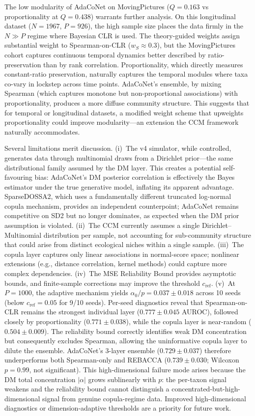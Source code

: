 \documentclass[unnumsec,webpdf,contemporary,large,numbered]{oup-authoring-template}
\theoremstyle{plain}
\theoremstyle{definition}
\begin{document}
The low modularity of AdaCoNet on MovingPictures ($Q{=}0.163$ vs proportionality at $Q{=}0.438$) warrants further analysis. On this longitudinal dataset ($N{=}1967$, $P{=}926$), the high sample size places the data firmly in the $N \gg P$ regime where Bayesian CLR is used. The theory-guided weights assign substantial weight to Spearman-on-CLR ($w_S \approx 0.3$), but the MovingPictures cohort captures continuous temporal dynamics better described by ratio-preservation than by rank correlation. Proportionality, which directly measures constant-ratio preservation, naturally captures the temporal modules where taxa co-vary in lockstep across time points. AdaCoNet's ensemble, by mixing Spearman (which captures monotone but non-proportional associations) with proportionality, produces a more diffuse community structure. This suggests that for temporal or longitudinal datasets, a modified weight scheme that upweights proportionality could improve modularity---an extension the CCM framework naturally accommodates.

Several limitations merit discussion. (i)~The v4 simulator, while controlled, generates data through multinomial draws from a Dirichlet prior---the same distributional family assumed by the DM layer. This creates a potential self-favouring bias: AdaCoNet's DM posterior correlation is effectively the Bayes estimator under the true generative model, inflating its apparent advantage. SparseDOSSA2, which uses a fundamentally different truncated log-normal copula mechanism, provides an independent counterpoint; AdaCoNet remains competitive on SD2 but no longer dominates, as expected when the DM prior assumption is violated. (ii)~The CCM currently assumes a single Dirichlet--Multinomial distribution per sample, not accounting for sub-community structure that could arise from distinct ecological niches within a single sample. (iii)~The copula layer captures only linear associations in normal-score space; nonlinear extensions (e.g., distance correlation, kernel methods) could capture more complex dependencies. (iv)~The MSE Reliability Bound provides asymptotic bounds, and finite-sample corrections may improve the threshold $c_{\text{ref}}$. (v)~At $P{=}1000$, the adaptive mechanism yields $\alpha_0/p = 0.037 \pm 0.018$ across 10 seeds (below $c_{\text{ref}} = 0.05$ for 9/10 seeds). Per-seed diagnostics reveal that Spearman-on-CLR remains the strongest individual layer ($0.777 \pm 0.045$ AUROC), followed closely by proportionality ($0.771 \pm 0.038$), while the copula layer is near-random ($0.504 \pm 0.009$). The reliability bound correctly identifies weak DM concentration but consequently excludes Spearman, allowing the uninformative copula layer to dilute the ensemble. AdaCoNet's 3-layer ensemble ($0.729 \pm 0.037$) therefore underperforms both Spearman-only and REBACCA ($0.739 \pm 0.030$; Wilcoxon $p = 0.99$, not significant). This high-dimensional failure mode arises because the DM total concentration $|\alpha|$ grows sublinearly with $p$: the per-taxon signal weakens and the reliability bound cannot distinguish a concentrated-but-high-dimensional signal from genuine copula-regime data. Improved high-dimensional diagnostics or dimension-adaptive thresholds are a priority for future work.
\end{document}
